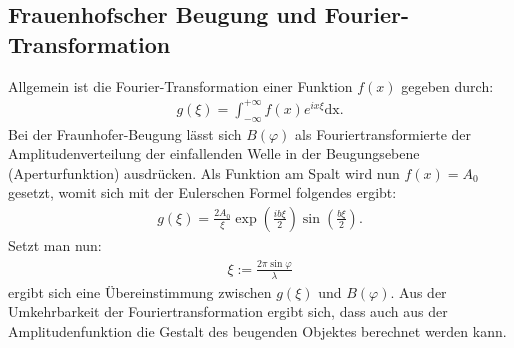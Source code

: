 \subsection{Frauenhofscher Beugung und Fourier-Transformation}
Allgemein ist die Fourier-Transformation einer Funktion $f(x)$ gegeben durch:
\begin{align*}
g(\xi) = \int_{-\infty}^{+\infty} f(x)e^{ix\xi}\text{dx.} \label{eq7}
\end{align*}
Bei der Fraunhofer-Beugung lässt sich $B(\varphi)$ als Fouriertransformierte der Amplitudenverteilung der einfallenden Welle in der Beugungsebene (Aperturfunktion) ausdrücken.
Als Funktion am Spalt wird nun $f(x)=A_0$ gesetzt, womit sich mit der Eulerschen Formel folgendes ergibt:
\begin{align*}
g(\xi)=\frac{2A_{0}}{\xi}\exp\left(\frac{ib\xi}{2}\right)\sin\left(\frac{b\xi}{2}\right)\text{.}
\end{align*}
Setzt man nun:
\begin{align*}
\xi := \frac{2\pi\sin\varphi}{\lambda}
\end{align*}
ergibt sich eine Übereinstimmung zwischen $g(\xi)$ und $B(\varphi)$. Aus der Umkehrbarkeit der Fouriertransformation ergibt sich, dass auch aus der Amplitudenfunktion die Gestalt des beugenden Objektes berechnet werden kann.


